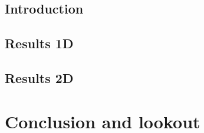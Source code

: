 \documentclass{book}
\newcounter{a}
\newcounter{b}
\begin{document}
\section{Introduction}


\section{Results 1D}\label{sec:results1d}


\section{Results 2D}


\chapter{Conclusion and lookout}





\end{document}
